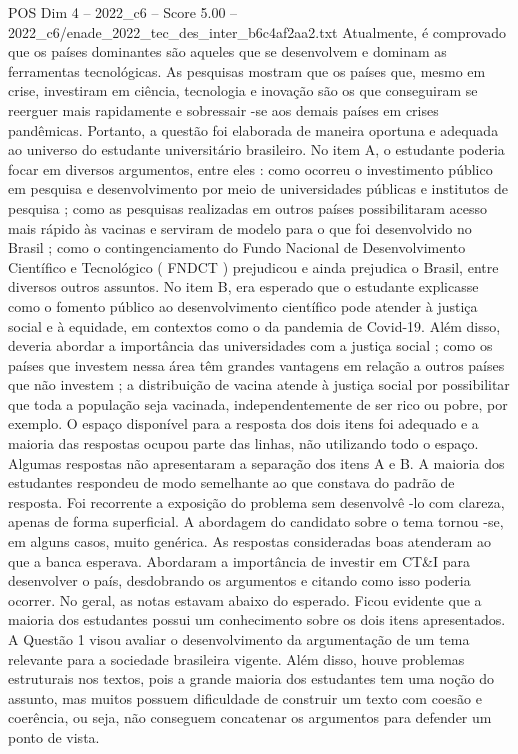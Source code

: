\begin{textsample}{POS Dim 4 – 2022\_c6 – Score 5.00 – 2022\_c6/enade\_2022\_tec\_des\_inter\_b6c4af2aa2.txt}
Atualmente, é comprovado que os países dominantes são aqueles que se desenvolvem e dominam as ferramentas tecnológicas.
As pesquisas mostram que os países que, mesmo em crise, investiram em ciência, tecnologia e inovação são os que conseguiram se reerguer mais rapidamente e sobressair -se aos demais países em crises pandêmicas.
Portanto, a questão foi elaborada de maneira oportuna e adequada ao universo do estudante universitário brasileiro.
No item A, o estudante poderia focar em diversos argumentos, entre eles : como ocorreu o investimento público em pesquisa e desenvolvimento por meio de universidades públicas e institutos de pesquisa ; como as pesquisas realizadas em outros países possibilitaram acesso mais rápido às vacinas e serviram de modelo para o que foi desenvolvido no Brasil ; como o contingenciamento do Fundo Nacional de Desenvolvimento Científico e Tecnológico ( FNDCT ) prejudicou e ainda prejudica o Brasil, entre diversos outros assuntos.
No item B, era esperado que o estudante explicasse como o fomento público ao desenvolvimento científico pode atender à justiça social e à equidade, em contextos como o da pandemia de Covid-19.
Além disso, deveria abordar a importância das universidades com a justiça social ; como os países que investem nessa área têm grandes vantagens em relação a outros países que não investem ; a distribuição de vacina atende à justiça social por possibilitar que toda a população seja vacinada, independentemente de ser rico ou pobre, por exemplo.
O espaço disponível para a resposta dos dois itens foi adequado e a maioria das respostas ocupou parte das linhas, não utilizando todo o espaço.
Algumas respostas não apresentaram a separação dos itens A e B.
A maioria dos estudantes respondeu de modo semelhante ao que constava do padrão de resposta.
Foi recorrente a exposição do problema sem desenvolvê -lo com clareza, apenas de forma superficial.
A abordagem do candidato sobre o tema tornou -se, em alguns casos, muito genérica.
As respostas consideradas boas atenderam ao que a banca esperava.
Abordaram a importância de investir em CT\&I para desenvolver o país, desdobrando os argumentos e citando como isso poderia ocorrer.
No geral, as notas estavam abaixo do esperado.
Ficou evidente que a maioria dos estudantes possui um conhecimento sobre os dois itens apresentados.
A Questão 1 visou avaliar o desenvolvimento da argumentação de um tema relevante para a sociedade brasileira vigente.
Além disso, houve problemas estruturais nos textos, pois a grande maioria dos estudantes tem uma noção do assunto, mas muitos possuem dificuldade de construir um texto com coesão e coerência, ou seja, não conseguem concatenar os argumentos para defender um ponto de vista.

\end{textsample}
